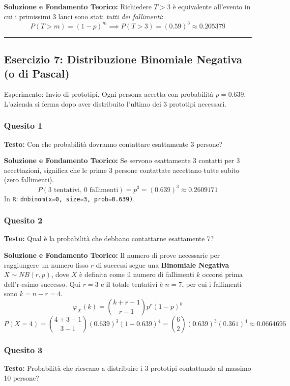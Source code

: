 \documentclass[12pt, a4paper]{article}
\begin{document}
\textbf{Soluzione e Fondamento Teorico:} 
Richiedere $T > 3$ è equivalente all'evento in cui i primissimi 3 lanci sono stati \textit{tutti dei fallimenti}:
$$ P(T > m) = (1-p)^m \implies P(T > 3) = (0.59)^3 \approx 0.205379 $$

\vspace{0.5cm}\hrule\vspace{0.5cm}

\subsection*{Esercizio 7: Distribuzione Binomiale Negativa (o di Pascal)}
Esperimento: Invio di prototipi. Ogni persona accetta con probabilità $p = 0.639$. L'azienda si ferma dopo aver distribuito l'ultimo dei 3 prototipi necessari.

\subsubsection*{Quesito 1}
\textbf{Testo:} Con che probabilità dovranno contattare esattamente 3 persone?

\textbf{Soluzione e Fondamento Teorico:} 
Se servono esattamente 3 contatti per 3 accettazioni, significa che le prime 3 persone contattate accettano tutte subito (zero fallimenti).
$$ P(\text{3 tentativi, 0 fallimenti}) = p^3 = (0.639)^3 \approx 0.2609171 $$
In \texttt{R}: \texttt{dnbinom(x=0, size=3, prob=0.639)}.

\subsubsection*{Quesito 2}
\textbf{Testo:} Qual è la probabilità che debbano contattarne esattamente 7?

\textbf{Soluzione e Fondamento Teorico:} 
Il numero di prove necessarie per raggiungere un numero fisso $r$ di successi segue una \textbf{Binomiale Negativa} $X \sim NB(r, p)$, dove $X$ è definita come il numero di fallimenti $k$ occorsi prima dell'r-esimo successo.
Qui $r = 3$ e il totale tentativi è $n = 7$, per cui i fallimenti sono $k = n - r = 4$.
$$ \varphi_X(k) = \binom{k+r-1}{r-1} p^r (1-p)^k $$
$$ P(X=4) = \binom{4+3-1}{3-1} (0.639)^3 (1 - 0.639)^4 = \binom{6}{2} (0.639)^3 (0.361)^4 \approx 0.0664695 $$

\subsubsection*{Quesito 3}
\textbf{Testo:} Probabilità che riescano a distribuire i 3 prototipi contattando al massimo 10 persone?
\end{document}
